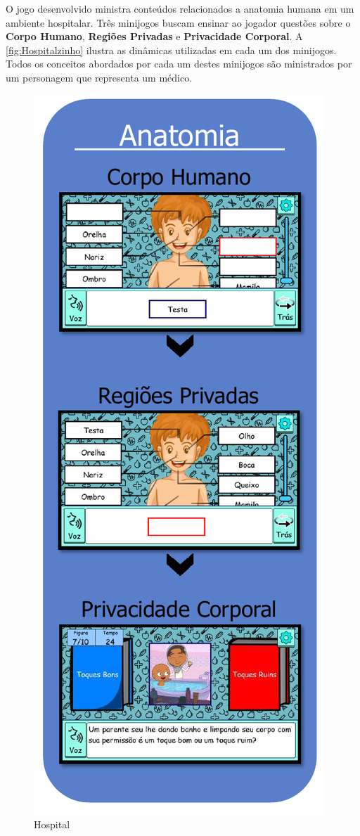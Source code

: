 O jogo desenvolvido ministra conteúdos relacionados a anatomia humana em um ambiente hospitalar. Três minijogos buscam ensinar ao jogador questões sobre o \textbf{Corpo Humano}, \textbf{Regiões Privadas} e \textbf{Privacidade Corporal}. A \autoref{fig:Hospitalzinho} ilustra as dinâmicas utilizadas em cada um dos minijogos. Todos os conceitos abordados por cada um destes minijogos são ministrados por um personagem que representa um médico. 

\begin{figure}%
  \vspace{-20pt}
  \caption{\label{fig:Hospitalzinho}Hospital}
  \includegraphics[width=\linewidth]{./Visuais/Hospital2.pdf}

\end{figure}

